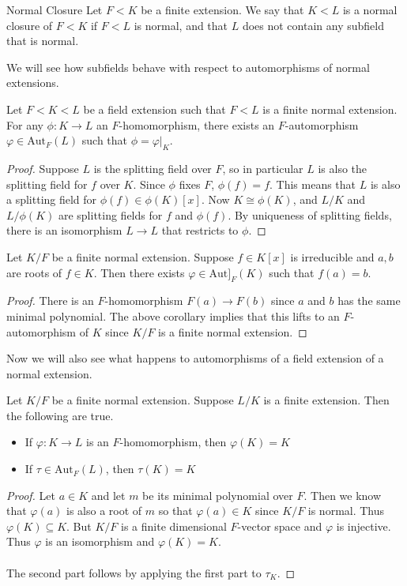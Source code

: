 \documentclass[a4paper]{article}
\begin{document}
\begin{defn}{Normal Closure}{} Let $F<K$ be a finite extension. We say that $K<L$ is a normal closure of $F<K$ if $F<L$ is normal, and that $L$ does not contain any subfield that is normal. 
\end{defn}

We will see how subfields behave with respect to automorphisms of normal extensions. 

\begin{crl}{}{} Let $F<K<L$ be a field extension such that $F<L$ is a finite normal extension. For any $\phi:K\to L$ an $F$-homomorphism, there exists an $F$-automorphism $\varphi\in\text{Aut}_F(L)$ such that $\phi=\varphi|_K$. \tcbline
\begin{proof}
Suppose $L$ is the splitting field over $F$, so in particular $L$ is also the splitting field for $f$ over $K$. Since $\phi$ fixes $F$, $\phi(f)=f$. This means that $L$ is also a splitting field for $\phi(f)\in\phi(K)[x]$. Now $K\cong\phi(K)$, and $L/K$  and $L/\phi(K)$ are splitting fields for $f$ and $\phi(f)$. By uniqueness of splitting fields, there is an isomorphism $L\to L$ that restricts to $\phi$. 
\end{proof}
\end{crl}

\begin{crl}{}{} Let $K/F$ be a finite normal extension. Suppose $f\in K[x]$ is irreducible and $a,b$ are roots of $f\in K$. Then there exists $\varphi\in\text{Aut]}_F(K)$ such that $f(a)=b$. \tcbline
\begin{proof}
There is an $F$-homomorphism $F(a)\to F(b)$ since $a$ and $b$ has the same minimal polynomial. The above corollary implies that this lifts to an $F$-automorphism of $K$ since $K/F$ is a finite normal extension. 
\end{proof}
\end{crl}

Now we will also see what happens to automorphisms of a field extension of a normal extension. 

\begin{prp}{}{} Let $K/F$ be a finite normal extension. Suppose $L/K$ is a finite extension. Then the following are true. 
\begin{itemize}
\item If $\varphi:K\to L$ is an $F$-homomorphism, then $\varphi(K)=K$
\item If $\tau\in\text{Aut}_F(L)$, then $\tau(K)=K$
\end{itemize} \tcbline
\begin{proof}
Let $a\in K$ and let $m$ be its minimal polynomial over $F$. Then we know that $\varphi(a)$ is also a root of $m$ so that $\varphi(a)\in K$ since $K/F$ is normal. Thus $\varphi(K)\subseteq K$. But $K/F$ is a finite dimensional $F$-vector space and $\varphi$ is injective. Thus $\varphi$ is an isomorphism and $\varphi(K)=K$. \\~\\

The second part follows by applying the first part to $\tau_K$. 
\end{proof}
\end{prp}
\end{document}
